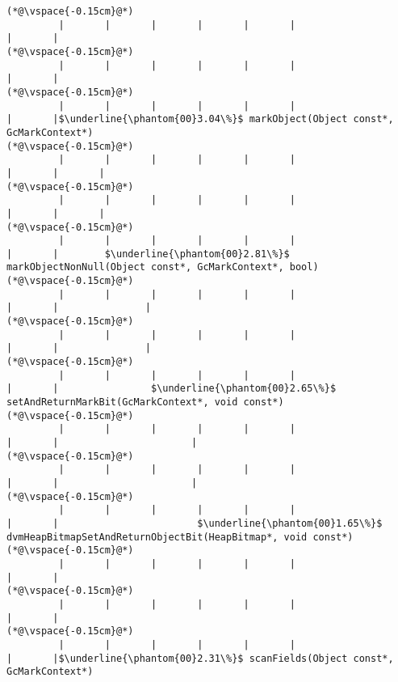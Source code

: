\begin{lstlisting}[caption=NewDirectByteBuffer, label=profile:C2JNewDirectBuffer-512, numberbychapter=true, frame=lines, float, floatplacement=t]
(*@\vspace{-0.15cm}@*)
         |       |       |       |       |       |                       |       |
(*@\vspace{-0.15cm}@*)
         |       |       |       |       |       |                       |       |
(*@\vspace{-0.15cm}@*)
         |       |       |       |       |       |                       |       |$\underline{\phantom{00}3.04\%}$ markObject(Object const*, GcMarkContext*)
(*@\vspace{-0.15cm}@*)
         |       |       |       |       |       |                       |       |       |
(*@\vspace{-0.15cm}@*)
         |       |       |       |       |       |                       |       |       |
(*@\vspace{-0.15cm}@*)
         |       |       |       |       |       |                       |       |        $\underline{\phantom{00}2.81\%}$ markObjectNonNull(Object const*, GcMarkContext*, bool)
(*@\vspace{-0.15cm}@*)
         |       |       |       |       |       |                       |       |               |
(*@\vspace{-0.15cm}@*)
         |       |       |       |       |       |                       |       |               |
(*@\vspace{-0.15cm}@*)
         |       |       |       |       |       |                       |       |                $\underline{\phantom{00}2.65\%}$ setAndReturnMarkBit(GcMarkContext*, void const*)
(*@\vspace{-0.15cm}@*)
         |       |       |       |       |       |                       |       |                       |
(*@\vspace{-0.15cm}@*)
         |       |       |       |       |       |                       |       |                       |
(*@\vspace{-0.15cm}@*)
         |       |       |       |       |       |                       |       |                        $\underline{\phantom{00}1.65\%}$ dvmHeapBitmapSetAndReturnObjectBit(HeapBitmap*, void const*)
(*@\vspace{-0.15cm}@*)
         |       |       |       |       |       |                       |       |
(*@\vspace{-0.15cm}@*)
         |       |       |       |       |       |                       |       |
(*@\vspace{-0.15cm}@*)
         |       |       |       |       |       |                       |       |$\underline{\phantom{00}2.31\%}$ scanFields(Object const*, GcMarkContext*)

\end{lstlisting}
